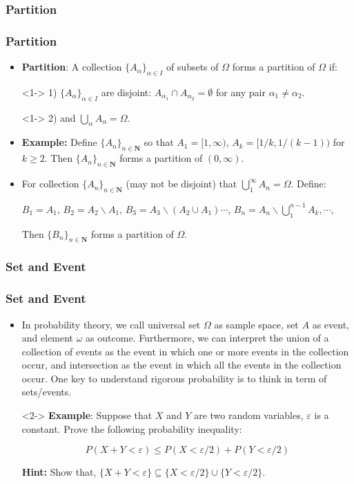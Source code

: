 \documentclass[handout]{beamer}
\begin{document}
\subsubsection{Partition}
\frame
{
  \frametitle{Partition}

\begin{itemize}
\item<1-> \textbf{Partition}: A collection $ \{A_\alpha\}_{\alpha\in I}$ of subsets of $\Omega$ forms a partition of $\Omega$ if:
 \item[]<1-> 1) $ \{A_\alpha\}_{\alpha\in I}$ are disjoint: $A_{\alpha_1} \cap A_{\alpha_2}=\emptyset$ for any pair $\alpha_1 \neq \alpha_2$.
 \item[]<1-> 2) and $\bigcup_\alpha A_\alpha=\Omega$.


\item<2-> \textbf{Example:} Define $\{A_n\}_{n \in\mathbf{N}}$  so that $A_1=[1,\infty)$, $A_k=[1/k, 1/(k-1))$ for $k\geq 2$. Then $\{A_n\}_{n \in\mathbf{N}}$ forms a partition of $(0,\infty)$.


\item<3-> For collection $ \{A_n\}_{n\in \mathbf{N}}$ (may not be disjoint)  that $\bigcup_1^{\infty} A_n=\Omega$. Define:

 $B_1=A_1$, $B_2=A_2\backslash A_1$, $B_3=A_3\backslash (A_2\cup A_1)\cdots $,  $B_n=A_n \backslash \bigcup_1^{n-1} A_k,\cdots$,

Then $ \{B_n\}_{n\in \mathbf{N}}$ forms a partition of $\Omega$.

\end{itemize}

}


\subsubsection{Set and Event}
\frame
{
  \frametitle{Set and Event}

\begin{itemize}
\item<1-> In probability theory, we call universal set $\Omega$ as sample space, set $A$ as event, and element $\omega$ as outcome. Furthermore, we can interpret the union of a collection of events as the event in which one or more events in the collection occur, and intersection as the event in which all the events in the collection occur. One key to understand rigorous probability is to think in term of sets/events.  

\item [] <2-> \textbf{Example}: Suppose that $X$ and $Y$ are two random variables, $\varepsilon$ is a constant. Prove the following probability inequality:

$$P(X+Y<\varepsilon)\leq P(X<\varepsilon/2)+P(Y<\varepsilon/2)$$

\textbf{Hint:} Show that, $\{X+Y<\varepsilon\}\subseteq \{X<\varepsilon/2\}\cup \{Y<\varepsilon/2\}$.

\end{itemize}

}
\end{document}
